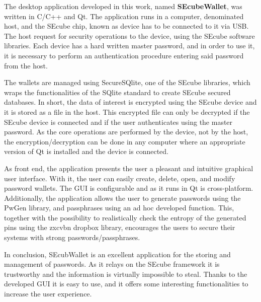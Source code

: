 \documentclass[%
    corpo=13pt,
    twoside,
    oldstyle,
    autoretitolo,
    greek,
    evenboxes,
    numerazioneromana,
    tipotesi=magistrale,
]{toptesi}
\begin{document}
The desktop application developed in this work, named \textbf{SEcubeWallet}, was written in C/C++ and Qt. The application runs in a computer, denominated host, and the SEcube chip, known as device has to be connected to it via USB. The host request for security operations to the device, using the SEcube software libraries. Each device has a hard written master password, and in order to use it, it is necessary to perform an authentication procedure entering said password from the host.

The wallets are managed using SecureSQlite, one of the SEcube libraries, which wraps the functionalities of the SQlite standard to create SEcube secured databases. In short, the data of interest is encrypted using the SEcube device and it is stored as a file in the host. This encrypted file can only be decrypted if the SEcube device is connected and if the user authenticates using the master password. 
As the core operations are performed by the device, not by the host, the encryption/decryption can be done in any computer where an appropriate version of Qt is installed and the device is connected.

As front end, the application presents the user a pleasant and intuitive graphical user interface. With it, the user can easily create, delete, open, and modify password wallets. The GUI is configurable and as it runs in Qt is cross-platform.
Additionally, the application allows the user to generate passwords using the PwGen library, and passphrases using an ad hoc developed function. This, together with the possibility to realistically check the entropy of the generated pins using the zxcvbn dropbox library, encourages the users to secure their systems with strong passwords/passphrases.

In conclusion, SEcubWallet is an excellent application for the storing and management of passwords. As it relays on the SEcube framework it is trustworthy and the information is virtually impossible to steal. Thanks to the developed GUI it is easy to use, and it offers some interesting functionalities to increase the user experience.





\indici

\listoffigures
\listoftables
\lstlistoflistings
\end{document}
